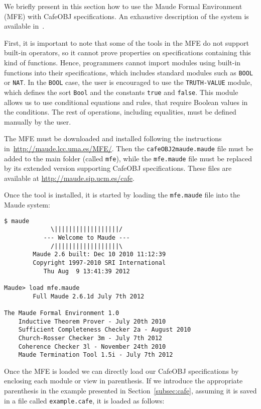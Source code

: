 
We briefly present in this section how to use the Maude Formal Environment (MFE) with
CafeOBJ specifications. An exhaustive description of the system is available in~\cite{mfe11}.

First, it is important to note that some of the tools in the MFE do not support built-in operators,
so it cannot prove properties on specifications containing this kind of functions.
%
Hence, programmers cannot import modules using built-in functions into their specifications,
which includes standard modules such as \texttt{BOOL} or \texttt{NAT}.
%
In the \texttt{BOOL} case, the user is encouraged to use the \texttt{TRUTH-VALUE} module,
which defines the sort \texttt{Bool} and the constants \texttt{true} and \texttt{false}. This module
allows us to use conditional equations and rules, that require Boolean values in the conditions.
The rest of operations, including equalities, must be defined manually by the user.

The MFE must be downloaded and installed following the instructions
in~\url{http://maude.lcc.uma.es/MFE/}. Then the \texttt{cafeOBJ2maude.maude} file must
be added to the main folder (called \texttt{mfe}), while the \texttt{mfe.maude} file must be
replaced by its extended version supporting CafeOBJ specifications.
These files are available at \url{http://maude.sip.ucm.es/cafe}.

Once the tool is installed, it is started by loading the \verb"mfe.maude" file into the Maude system:

{\codesize
\begin{verbatim}
$ maude 
		     \||||||||||||||||||/
		   --- Welcome to Maude ---
		     /||||||||||||||||||\
	    Maude 2.6 built: Dec 10 2010 11:12:39
	    Copyright 1997-2010 SRI International
		   Thu Aug  9 13:41:39 2012

Maude> load mfe.maude
	    Full Maude 2.6.1d July 7th 2012

The Maude Formal Environment 1.0
    Inductive Theorem Prover - July 20th 2010
    Sufficient Completeness Checker 2a - August 2010
    Church-Rosser Checker 3m - July 7th 2012
    Coherence Checker 3l - November 24th 2010
    Maude Termination Tool 1.5i - July 7th 2012
\end{verbatim}
}

Once the MFE is loaded we can directly load our CafeOBJ specifications by enclosing each module or
view in parenthesis. If we introduce the appropriate parenthesis in the example presented in
Section~\ref{subsec:cafe}, assuming it is saved in a file called \texttt{example.cafe}, it is loaded as
follows:

